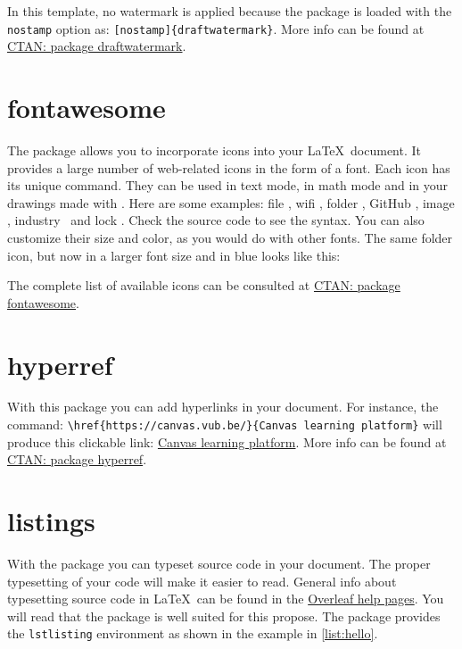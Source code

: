 In this template, no watermark is applied because the package is loaded with the \texttt{nostamp} option as: \verb|[nostamp]{draftwatermark}|. More info can be found at \href{https://ctan.org/pkg/draftwatermark}{CTAN: package draftwatermark}.

\section{fontawesome}\label{sec:fontawesome}
The package  allows you to incorporate icons into your \LaTeX\ document. It provides a large number of web-related icons in the form of a font. Each icon has its unique command. They can be used in text mode, in math mode and in your drawings made with \TikZ. Here are some examples: file \faFileO, wifi \faWifi, folder \faFolderO, GitHub \faGithub, image \faImage, industry \faIndustry\ and lock \faLock. Check the source code to see the syntax. You can also customize their size and color, as you would do with other fonts. The same folder icon, but now in a larger font size and in blue looks like this:

\textcolor{blue}{\Huge\faFolderO}

The complete list of available icons can be consulted at \href{https://ctan.org/pkg/fontawesome}{CTAN: package fontawesome}.

\section{hyperref}\label{sec:hyperref}
With this package you can add hyperlinks in your document. For instance, the command:
\verb|\href{https://canvas.vub.be/}{Canvas learning platform}| will produce this clickable link: \href{https://canvas.vub.be/}{Canvas learning platform}. More info can be found at \href{https://ctan.org/pkg/hyperref}{CTAN: package hyperref}.

\section{listings}\label{sec:listing}
With the package  you can typeset source code in your document. The proper typesetting of your code will make it easier to read. General info about typesetting source code in \LaTeX\ can be found in the \href{https://www.overleaf.com/learn/latex/Code_listing}{Overleaf help pages}. You will read that the package  is well suited for this propose. The package provides the \texttt{lstlisting} environment as shown in the  example in \cref{list:hello}. 

